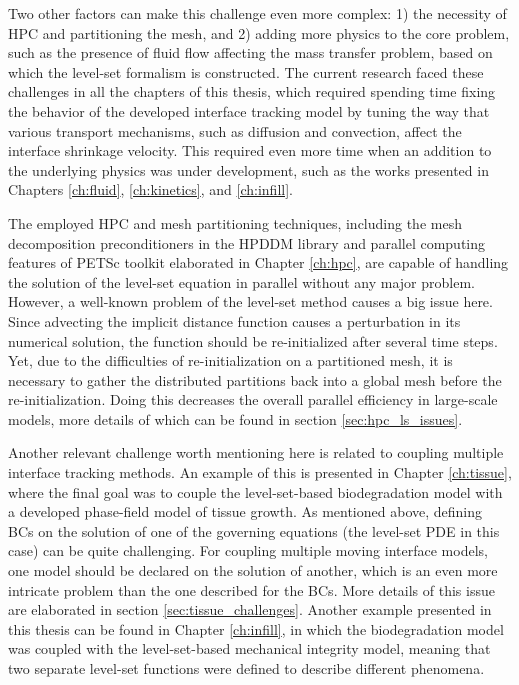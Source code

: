 Two other factors can make this challenge even more complex: 1) the necessity of \gls{HPC} and partitioning the mesh, and 2) adding more physics to the core problem, such as the presence of fluid flow affecting the mass transfer problem, based on which the level-set formalism is constructed. The current research faced these challenges in all the chapters of this thesis, which required spending time fixing the behavior of the developed interface tracking model by tuning the way that various transport mechanisms, such as diffusion and convection, affect the interface shrinkage velocity. This required even more time when an addition to the underlying physics was under development, such as the works presented in Chapters \ref{ch:fluid}, \ref{ch:kinetics}, and \ref{ch:infill}.

The employed \gls{HPC} and mesh partitioning techniques, including the mesh decomposition preconditioners in the \gls{HPDDM} library and parallel computing features of \gls{PETSc} toolkit elaborated in Chapter \ref{ch:hpc}, are capable of handling the solution of the level-set equation in parallel without any major problem. However, a well-known problem of the level-set method causes a big issue here. Since advecting the implicit distance function causes a perturbation in its numerical solution, the function should be re-initialized after several time steps. Yet, due to the difficulties of re-initialization on a partitioned mesh, it is necessary to gather the distributed partitions back into a global mesh before the re-initialization. Doing this decreases the overall parallel efficiency in large-scale models, more details of which can be found in section \ref{sec:hpc_ls_issues}.

Another relevant challenge worth mentioning here is related to coupling multiple interface tracking methods. An example of this is presented in Chapter \ref{ch:tissue}, where the final goal was to couple the level-set-based biodegradation model with a developed phase-field model of tissue growth. As mentioned above, defining \gls{BC}s on the solution of one of the governing equations (the level-set \gls{PDE} in this case) can be quite challenging. For coupling multiple moving interface models, one model should be declared on the solution of another, which is an even more intricate problem than the one described for the \gls{BC}s. More details of this issue are elaborated in section \ref{sec:tissue_challenges}. Another example presented in this thesis can be found in Chapter \ref{ch:infill}, in which the biodegradation model was coupled with the level-set-based mechanical integrity model, meaning that two separate level-set functions were defined to describe different phenomena.


